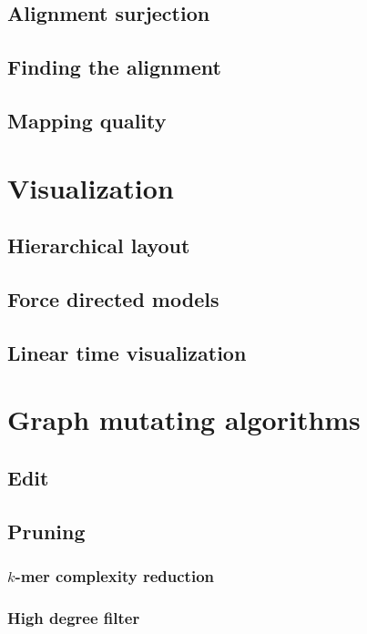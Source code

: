 \subsection{Alignment surjection}


\subsection{Finding the alignment}

\subsection{Mapping quality}


\section{Visualization}

\subsection{Hierarchical layout}

\subsection{Force directed models}

\subsection{Linear time visualization}


\section{Graph mutating algorithms}

\subsection{Edit}

\subsection{Pruning}
\subsubsection{$k$-mer complexity reduction}
\subsubsection{High degree filter}

